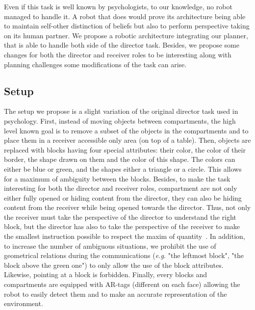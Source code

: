\documentclass[a4paper,11pt,twoside]{StyleThese}
\begin{document}
Even if this task is well known by psychologists, to our knowledge, no robot managed to handle it. A robot that does would prove its architecture being able to maintain self-other distinction of beliefs but also to perform perspective taking on its human partner. We propose a robotic architecture integrating our planner, that is able to handle both side of the director task. Besides, we propose some changes for both the director and receiver roles to be interesting along with planning challenges some modifications of the task can arise.

\subsection{Setup}
The setup we propose is a slight variation of the original director task used in psychology. First, instead of moving objects between compartments, the high level known goal is to remove a subset of the objects in the compartments and to place them in a receiver accessible only area (on top of a table). 
Then, objects are replaced with blocks having four special attributes: their color, the color of their border, the shape drawn on them and the color of this shape. The colors can either be blue or green, and the shapes either a triangle or a circle. This allows for a maximum of ambiguity between the blocks. 
Besides, to make the task interesting for both the director and receiver roles, compartment are not only either fully opened or hiding content from the director, they can also be hiding content from the receiver while being opened towards the director. Thus, not only the receiver must take the perspective of the director to understand the right block, but the director has also to take the perspective of the receiver to make the smallest instruction possible to respect the maxim of quantity~\cite{grice1975logic}.
In addition, to increase the number of ambiguous situations, we prohibit the use of geometrical relations during the communications (\textit{e.g.} "the leftmost block", "the block above the green one") to only allow the use of the block attributes. Likewise, pointing at a block is forbidden.
Finally, every blocks and compartments are equipped with AR-tags (different on each face) allowing the robot to easily detect them and to make an accurate representation of the environment.
\end{document}
